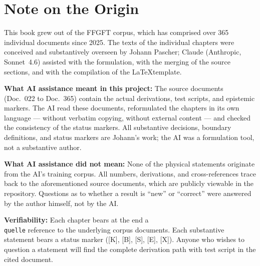\chapter*{Note on the Origin}

This book grew out of the FFGFT corpus, which has comprised over 365
individual documents since 2025. The texts of the individual chapters were
conceived and substantively overseen by Johann Pascher; Claude
(Anthropic, Sonnet~4.6) assisted with the formulation, with the merging
of the source sections, and with the compilation of the \LaTeX template.

\medskip\noindent\textbf{What AI assistance meant in this project:}
The source documents (Doc.~022 to Doc.~365) contain the actual
derivations, test scripts, and epistemic markers. The AI read these
documents, reformulated the chapters in its own language --- without
verbatim copying, without external content --- and checked the consistency
of the status markers. All substantive decisions, boundary definitions, and
status markers are Johann's work; the AI was a formulation tool,
not a substantive author.

\medskip\noindent\textbf{What AI assistance did not mean:}
None of the physical statements originate from the AI's training corpus.
All numbers, derivations, and cross-references trace back to the
aforementioned source documents, which are publicly viewable in the repository.
Questions as to whether a result is \enquote{new} or \enquote{correct}
were answered by the author himself, not by the AI.

\medskip\noindent\textbf{Verifiability:} Each chapter bears at the end
a \texttt{\\quelle} reference to the underlying
corpus documents. Each substantive statement bears a status marker
([K], [B], [S], [E], [X]). Anyone who wishes to question a statement
will find the complete derivation path with
test script in the cited document.